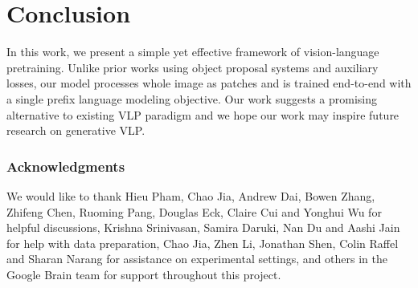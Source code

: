 \section{Conclusion}
In this work, we present a simple yet effective framework of vision-language pretraining. Unlike prior works using object proposal systems and auxiliary losses, our model processes whole image as patches and is trained end-to-end with a single prefix language modeling objective. Our work suggests a promising alternative to existing VLP paradigm and we hope our work may inspire future research on generative VLP.

\subsubsection*{Acknowledgments}
We would like to thank Hieu Pham, Chao Jia, Andrew Dai, Bowen Zhang, Zhifeng Chen, Ruoming Pang, Douglas Eck, Claire Cui and Yonghui Wu for helpful discussions, Krishna Srinivasan, Samira Daruki, Nan Du and Aashi Jain for help with data preparation, Chao Jia, Zhen Li, Jonathan Shen, Colin Raffel and Sharan Narang for assistance on experimental settings, and others in the Google Brain team for support throughout this project.


